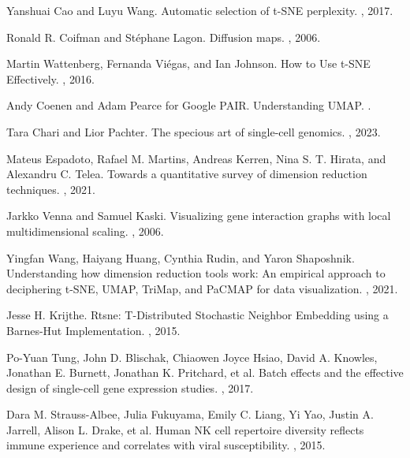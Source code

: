 \documentclass{article}
\begin{document}
\begin{thebibliography}{10}
Yanshuai Cao and Luyu Wang. 
\newblock Automatic selection of t-SNE perplexity.
, 2017.

Ronald R. Coifman and St\'ephane Lagon.
\newblock Diffusion maps.
, 2006.

Martin Wattenberg, Fernanda Vi\'egas, and Ian Johnson.
\newblock How to Use t-SNE Effectively.
, 2016.

Andy Coenen and Adam Pearce for Google PAIR.
\newblock Understanding UMAP.
.

Tara Chari and Lior Pachter.
\newblock The specious art of single-cell genomics.
,  2023.

Mateus Espadoto, Rafael M. Martins, Andreas Kerren, Nina S. T. Hirata, and Alexandru C. Telea.
\newblock Towards a quantitative survey of dimension reduction techniques.
, 2021.

Jarkko Venna and Samuel Kaski.
\newblock Visualizing gene interaction graphs with local multidimensional scaling.
, 2006.

Yingfan Wang, Haiyang Huang, Cynthia Rudin, and Yaron Shaposhnik.
\newblock Understanding how dimension reduction tools work: An empirical approach to deciphering t-SNE, UMAP, TriMap, and PaCMAP for data visualization.
, 2021.

Jesse H. Krijthe.
\newblock Rtsne: T-Distributed Stochastic Neighbor Embedding using a Barnes-Hut Implementation.
, 2015.

 Po-Yuan Tung, John D. Blischak, Chiaowen Joyce Hsiao, David A. Knowles, Jonathan E. Burnett, Jonathan K. Pritchard, et al.
 \newblock Batch effects and the effective design of single-cell gene expression studies.
 , 2017.

Dara M. Strauss-Albee, Julia Fukuyama, Emily C. Liang, Yi Yao, Justin A. Jarrell, Alison L. Drake, et al.
\newblock Human NK cell repertoire diversity reflects immune experience and correlates with viral susceptibility.
, 2015.


\end{thebibliography}
\end{document}
